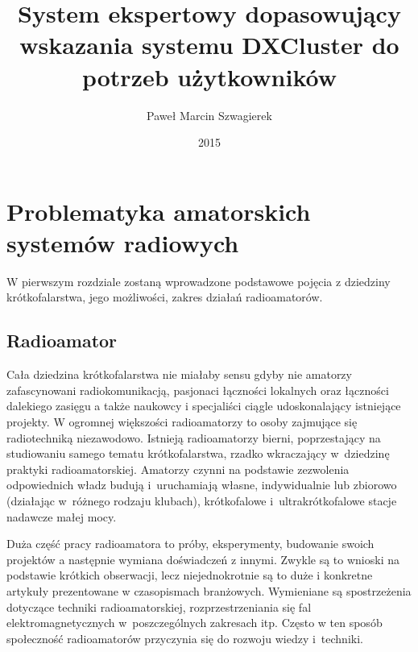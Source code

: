 \documentclass[]{mgr}
\title{System ekspertowy dopasowujący wskazania systemu DXCluster do potrzeb użytkowników}
\author{Paweł Marcin Szwagierek}
\date{2015}
\begin{document}
    
    \maketitle

    \tableofcontents

    \chapter{Problematyka amatorskich systemów radiowych}
    \label{sec:teoretical_description}
    W pierwszym rozdziale zostaną wprowadzone podstawowe pojęcia z dziedziny krótkofalarstwa, jego możliwości, zakres działań radioamatorów.

        \section{Radioamator}
        Cała dziedzina krótkofalarstwa nie miałaby sensu gdyby nie amatorzy zafascynowani radiokomunikacją, pasjonaci łączności lokalnych oraz łączności dalekiego zasięgu a także naukowcy i specjaliści ciągle udoskonalający istniejące projekty. W ogromnej większości radioamatorzy to osoby zajmujące się radiotechniką niezawodowo. Istnieją radioamatorzy bierni, poprzestający na studiowaniu samego tematu krótkofalarstwa, rzadko wkraczający w~dziedzinę praktyki radioamatorskiej. Amatorzy czynni na podstawie zezwolenia odpowiednich władz budują i~uruchamiają własne, indywidualnie lub zbiorowo (działając w~różnego rodzaju klubach), krótkofalowe i~ultrakrótkofalowe stacje nadawcze małej mocy.

        Duża część pracy radioamatora to próby, eksperymenty, budowanie swoich projektów a następnie wymiana doświadczeń z innymi. Zwykle są to wnioski na podstawie krótkich obserwacji, lecz niejednokrotnie są to duże i konkretne artykuły prezentowane w czasopismach branżowych. Wymieniane są spostrzeżenia dotyczące techniki radioamatorskiej, rozprzestrzeniania się fal elektromagnetycznych w~poszczególnych zakresach itp. Często w ten sposób społeczność radioamatorów przyczynia się do rozwoju wiedzy i~techniki. 
\end{document}
